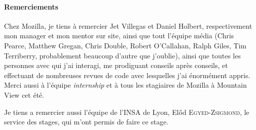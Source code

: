 \documentclass[a4paper,10pt]{article}
\begin{document}
\begin{multicols}{2}
  \columnbreak
    \paragraph*{Remerciements}
    Chez Mozilla, je tiens à remercier Jet Villegas et Daniel Holbert,
    respectivement mon manager et mon mentor sur site, ainsi que tout l'équipe
    média (Chris Pearce, Matthew Gregan, Chris Double, Robert O'Callahan, Ralph
    Giles, Tim Terriberry, probablement beaucoup d'autre que j'oublie), ainsi que
    toutes les personnes avec qui j'ai interagi, me prodiguant conseils après
    conseils, et effectuant de nombreuses revues de code avec lesquelles j'ai
    énormément appris. Merci aussi à l'équipe \emph{internship} et à tous les
    stagiaires de Mozilla à Mountain View cet été.

    Je tiens a remercier aussi l'équipe de l'INSA de Lyon, Előd
    \textsc{Egyed-Zsigmond}, le service des stages, qui m'ont permis de faire ce
    stage.



\end{multicols}
\end{document}
